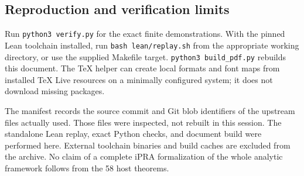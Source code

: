 \subsection{Reproduction and verification limits}

Run \texttt{python3 verify.py} for the exact finite demonstrations. With
the pinned Lean toolchain installed, run \texttt{bash lean/replay.sh} from
the appropriate working directory, or use the supplied Makefile target.
\texttt{python3 build\_pdf.py} rebuilds this document. The TeX helper
can create local formats and font maps from installed TeX Live resources
on a minimally configured system; it does not download missing packages.

The manifest records the source commit and Git blob identifiers of the
upstream files actually used. Those files were inspected, not rebuilt in
this session. The standalone Lean replay, exact Python checks, and document
build were performed here. External toolchain binaries and build caches
are excluded from the archive. No claim of a complete iPRA formalization
of the whole analytic framework follows from the 58 host theorems.
